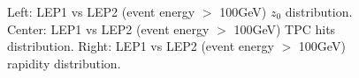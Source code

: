 \begin{figure}[H]
\centering
{}\hfill
{}\hfill %
\hfill %
\caption{Left: LEP1 vs LEP2 (event energy $>$ 100GeV) $z_0$ distribution. Center: LEP1 vs LEP2 (event energy $>$ 100GeV) TPC hits distribution. Right: LEP1 vs LEP2 (event energy $>$ 100GeV) rapidity distribution.}
\end{figure}


